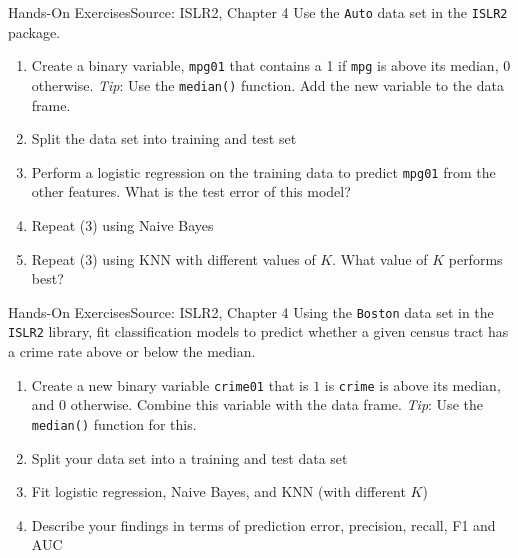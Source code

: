 \documentclass[ignorenonframetext,xcolor=x11names]{beamer}
\begin{document}
\begin{frame}{Hands-On Exercises}{Source: ISLR2, Chapter 4}
Use the \texttt{Auto} data set in the \texttt{ISLR2} package.
\begin{enumerate}
   \item Create a binary variable, \texttt{mpg01} that contains a 1 if \texttt{mpg} is above its median, 0 otherwise. \emph{Tip}: Use the \texttt{median()} function. Add the new variable to the data frame.
   \item Split the data set into training and test set
   \item Perform a logistic regression on the training data to predict \texttt{mpg01} from the other features. What is the test error of this model?
   \item Repeat (3) using Naive Bayes
   \item Repeat (3) using KNN with different values of $K$. What value of $K$ performs best?
\end{enumerate}
\end{frame}

\begin{frame}{Hands-On Exercises}{Source: ISLR2, Chapter 4}
Using the \texttt{Boston} data set in the \texttt{ISLR2} library, fit classification models to predict whether a given census tract has a crime rate above or below the median.
\begin{enumerate}
   \item Create a new binary variable \texttt{crime01} that is $1$ is \texttt{crime} is above its median, and $0$ otherwise. Combine this variable with the data frame. \emph{Tip}: Use the \texttt{median()} function for this.
   \item Split your data set into a training and test data set
   \item Fit logistic regression, Naive Bayes, and KNN (with different $K$)
   \item Describe your findings in terms of prediction error, precision, recall, F1 and AUC
\end{enumerate}
\end{frame}
\end{document}
